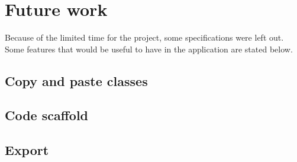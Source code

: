 \section{Future work}
\label{sec:future_work}

Because of the limited time for the project, some specifications were left out. Some features that would be useful to have in the application are stated below.

\subsection{Copy and paste classes}

\subsection{Code scaffold}

\subsection{Export}




